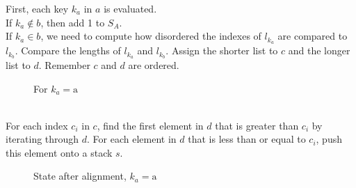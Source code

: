 \documentclass[10pt]{article}
\begin{document}
  First, each key $k_a$ in $a$ is evaluated.  \\[2ex]
  If $k_a \notin b$, then add 1 to $S_A$.  \\[2ex]
  If $k_a \in b$, we need to compute how disordered the indexes of $l_{k_a}$ are compared to $l_{k_b}$.  Compare the lengths of $l_{k_a}$ and $l_{k_b}$.  Assign the shorter list to $c$ and the longer list to $d$.  Remember $c$ and $d$ are ordered.  
  \begin{figure}[h]
    \centering
    \centering
    \caption{For $k_a=\text{a}$}
  \end{figure}\\[2ex]
For each index $c_i$ in $c$, find the first element in $d$ that is greater than $c_i$ by iterating through $d$.  For each element in $d$ that is less than or equal to $c_i$, push this element onto a stack $s$.\\[2ex]
\begin{figure}
  \centering
  \caption{State after alignment, $k_a=\text{a}$}
\end{figure}
\end{document}
